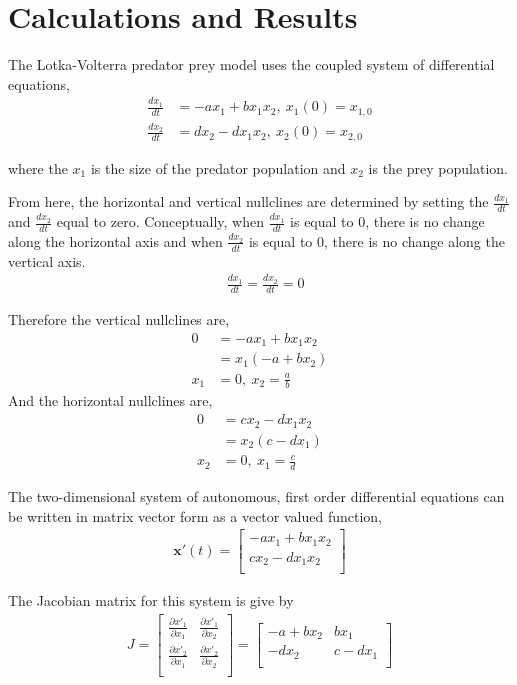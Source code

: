 \documentclass[12pt]{article}   %
\theoremstyle{definition}
\numberwithin{equation}{section}
\begin{document}
\section{Calculations and Results} \label{APPM2360proj01sec01}
The Lotka-Volterra predator prey model uses the coupled system of differential equations,
\begin{align*}
%
\frac{dx_1}{dt} & = -ax_1 + bx_1x_2 ,\ x_1(0) = x_{1,0}\\
%
\frac{dx_2}{dt} & = dx_2 - dx_1x_2 ,\ x_2(0) = x_{2,0}
%
\end{align*}

where the $x_1$ is the size of the predator population and $x_2$ is the prey population. 

From here, the horizontal and vertical nullclines are determined by setting the $\frac{dx_1}{dt}$ and $\frac{dx_2}{dt}$ equal to zero. Conceptually, when $\frac{dx_1}{dt}$ is equal to 0, there is no change along the horizontal axis and when $\frac{dx_2}{dt}$ is equal to 0, there is no change along the vertical axis. 
\begin{align*}
& \frac{dx_1}{dt} = \frac{dx_2}{dt} = 0
\end{align*}

Therefore the vertical nullclines are,
\begin{align*}
%
0 & =  -ax_1 + bx_1x_2 \\
%  
 & = x_1(-a + bx_2) \\
%
x_1 &= 0, \ x_2 = \frac{a}{b}  
%
\end{align*}
And the horizontal nullclines are, 
\begin{align*}
%
0 & = cx_2 - dx_1x_2 \\  
%
& =  x_2(c - dx_1) \\
%
x_2 &= 0, \ x_1 = \frac{c}{d} 
\end{align*}



The two-dimensional system of autonomous, first order differential equations can be written in matrix vector form as a vector valued function, 
\begin{align*} 
\textbf{x}'(t) 
= 
\begin{bmatrix}
     -ax_1 + bx_1x_2\\
     cx_2 - dx_1x_2\\
\end{bmatrix}
\end{align*}

The Jacobian matrix for this system is give by
\begin{align*} 
J 
=
\begin{bmatrix}
     \frac{\partial{x'_1}}{\partial{x_1}} & \frac{\partial{x'_1}}{\partial{x_2}}\\
     \frac{\partial{x'_2}}{\partial{x_1}} &  \frac{\partial{x'_2}}{\partial{x_2}}\\
\end{bmatrix}
=
\begin{bmatrix}
     -a+bx_2 & bx_1\\
     -dx_2 & c-dx_1\\
\end{bmatrix}
\end{align*}
\end{document}
